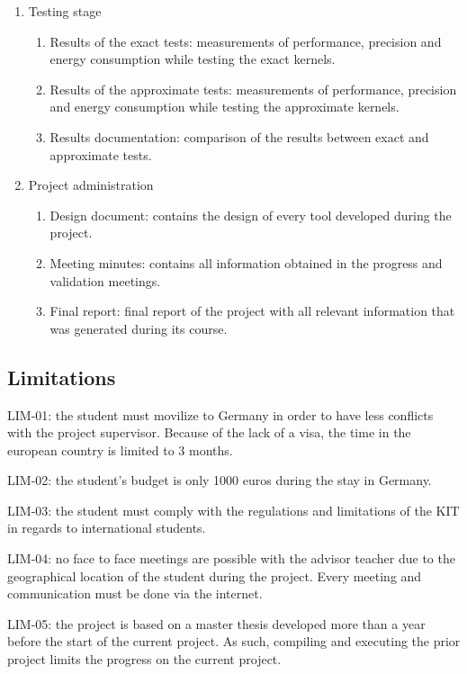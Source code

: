 \begin{enumerate}
    \item Testing stage
        \begin{enumerate}
            \item Results of the exact tests: measurements of performance, precision and energy consumption while
            testing the exact kernels.
            \item Results of the approximate tests: measurements of performance, precision and energy consumption while
            testing the approximate kernels.
            \item Results documentation: comparison of the results between exact and approximate tests.
        \end{enumerate}
    \item Project administration
        \begin{enumerate}
            \item Design document: contains the design of every tool developed during the project.
            \item Meeting minutes: contains all information obtained in the progress and validation
            meetings.
            \item Final report: final report of the project with all relevant information that was
            generated during its course.
        \end{enumerate}
    
\end{enumerate}

\subsection{Limitations}

LIM-01: the student must movilize to Germany in order to have less conflicts with the project supervisor.
Because of the lack of a visa, the time in the european country is limited to 3 months. 
 
LIM-02:​ the student's budget is only 1000 euros during the stay in Germany.

LIM-03: the student must comply with the regulations and limitations of the KIT in regards to international
students.

LIM-04: no face to face meetings are possible with the advisor teacher due to the geographical location of 
the student during the project. Every meeting and communication must be done via the internet.

LIM-05: the project is based on a master thesis developed more than a year before the start of the current
project. As such, compiling and executing the prior project limits the progress on the current project.


